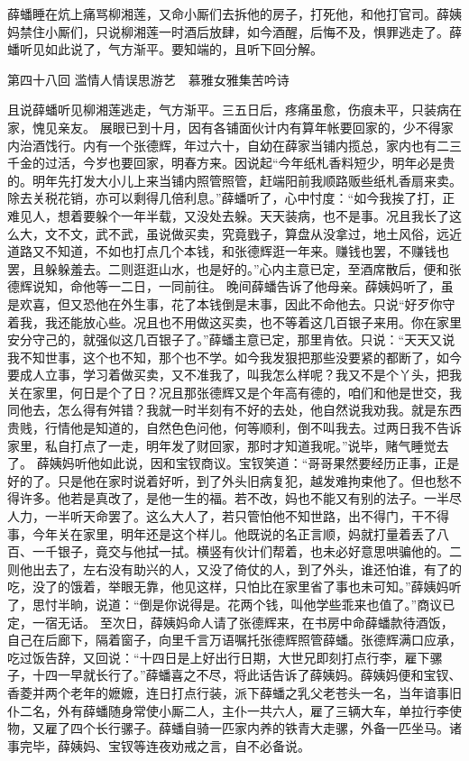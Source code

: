 \documentclass[12pt,oneside]{book}
\begin{document}
薛蟠睡在炕上痛骂柳湘莲，又命小厮们去拆他的房子，打死他，和他打官司。薛姨妈禁住小厮们，只说柳湘莲一时酒后放肆，如今酒醒，后悔不及，惧罪逃走了。薛蟠听见如此说了，气方渐平。要知端的，且听下回分解。
 

 
第四十八回  滥情人情误思游艺　慕雅女雅集苦吟诗


且说薛蟠听见柳湘莲逃走，气方渐平。三五日后，疼痛虽愈，伤痕未平，只装病在家，愧见亲友。
展眼已到十月，因有各铺面伙计内有算年帐要回家的，少不得家内治酒饯行。内有一个张德辉，年过六十，自幼在薛家当铺内揽总，家内也有二三千金的过活，今岁也要回家，明春方来。因说起“今年纸札香料短少，明年必是贵的。明年先打发大小儿上来当铺内照管照管，赶端阳前我顺路贩些纸札香扇来卖。除去关税花销，亦可以剩得几倍利息。”薛蟠听了，心中忖度：“如今我挨了打，正难见人，想着要躲个一年半载，又没处去躲。天天装病，也不是事。况且我长了这么大，文不文，武不武，虽说做买卖，究竟戥子，算盘从没拿过，地土风俗，远近道路又不知道，不如也打点几个本钱，和张德辉逛一年来。赚钱也罢，不赚钱也罢，且躲躲羞去。二则逛逛山水，也是好的。”心内主意已定，至酒席散后，便和张德辉说知，命他等一二日，一同前往。
晚间薛蟠告诉了他母亲。薛姨妈听了，虽是欢喜，但又恐他在外生事，花了本钱倒是末事，因此不命他去。只说“好歹你守着我，我还能放心些。况且也不用做这买卖，也不等着这几百银子来用。你在家里安分守己的，就强似这几百银子了。”薛蟠主意已定，那里肯依。只说：“天天又说我不知世事，这个也不知，那个也不学。如今我发狠把那些没要紧的都断了，如今要成人立事，学习着做买卖，又不准我了，叫我怎么样呢？我又不是个丫头，把我关在家里，何日是个了日？况且那张德辉又是个年高有德的，咱们和他是世交，我同他去，怎么得有舛错？我就一时半刻有不好的去处，他自然说我劝我。就是东西贵贱，行情他是知道的，自然色色问他，何等顺利，倒不叫我去。过两日我不告诉家里，私自打点了一走，明年发了财回家，那时才知道我呢。”说毕，赌气睡觉去了。
薛姨妈听他如此说，因和宝钗商议。宝钗笑道：“哥哥果然要经历正事，正是好的了。只是他在家时说着好听，到了外头旧病复犯，越发难拘束他了。但也愁不得许多。他若是真改了，是他一生的福。若不改，妈也不能又有别的法子。一半尽人力，一半听天命罢了。这么大人了，若只管怕他不知世路，出不得门，干不得事，今年关在家里，明年还是这个样儿。他既说的名正言顺，妈就打量着丢了八百、一千银子，竟交与他拭一拭。横竖有伙计们帮着，也未必好意思哄骗他的。二则他出去了，左右没有助兴的人，又没了倚仗的人，到了外头，谁还怕谁，有了的吃，没了的饿着，举眼无靠，他见这样，只怕比在家里省了事也未可知。”薛姨妈听了，思忖半晌，说道：“倒是你说得是。花两个钱，叫他学些乖来也值了。”商议已定，一宿无话。
至次日，薛姨妈命人请了张德辉来，在书房中命薛蟠款待酒饭，自己在后廊下，隔着窗子，向里千言万语嘱托张德辉照管薛蟠。张德辉满口应承，吃过饭告辞，又回说：“十四日是上好出行日期，大世兄即刻打点行李，雇下骡子，十四一早就长行了。”薛蟠喜之不尽，将此话告诉了薛姨妈。薛姨妈便和宝钗、香菱并两个老年的嬷嬷，连日打点行装，派下薛蟠之乳父老苍头一名，当年谙事旧仆二名，外有薛蟠随身常使小厮二人，主仆一共六人，雇了三辆大车，单拉行李使物，又雇了四个长行骡子。薛蟠自骑一匹家内养的铁青大走骡，外备一匹坐马。诸事完毕，薛姨妈、宝钗等连夜劝戒之言，自不必备说。
\end{document}
